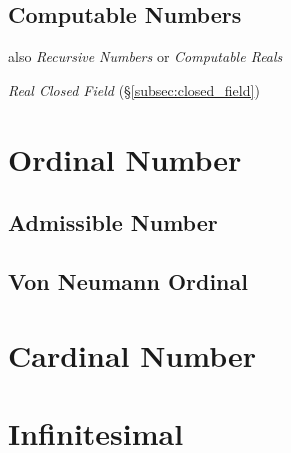 \documentclass{article}
\begin{document}
\subsection{Computable Numbers}\label{subsec:computable_real}

also \emph{Recursive Numbers} or \emph{Computable Reals}

\emph{Real Closed Field} (\S\ref{subsec:closed_field})



\section{Ordinal Number}\label{sec:ordinal_number}

\subsection{Admissible Number}\label{subsec:admissible_ordinal}

\subsection{Von Neumann Ordinal}\label{subsec:vonneumann_ordinal}



\section{Cardinal Number}\label{sec:cardinal_number}



\section{Infinitesimal}\label{sec:infinitesimal}
\end{document}
